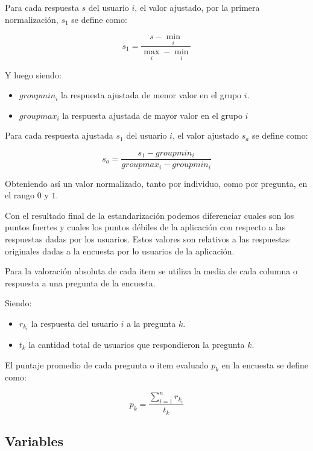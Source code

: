 Para cada respuesta $s$ del usuario $i$, el valor ajustado, por la primera 
normalización, $s_1$ se define como:

\begin{equation*}
s_1=\frac{s-\min_i}{\max_i-\min_i}
\end{equation*}

Y luego siendo:
\begin{itemize}
	\item $groupmin_i$ la respuesta ajustada de menor valor en el grupo $i$.
	\item $groupmax_i$ la respuesta ajustada de mayor valor en el grupo $i$
\end{itemize}

Para cada respuesta ajustada $s_1$ del usuario $i$, el valor ajustado $s_a$ se
define como:	

\begin{equation*}
s_a=\frac{s_1-groupmin_i}{groupmax_i-groupmin_i}
\end{equation*}

Obteniendo así un valor normalizado, tanto por individuo, como por pregunta, en
el rango $0$ y $1$.

Con el resultado final de la estandarización podemos diferenciar cuales son los
puntos fuertes y cuales los puntos débiles de la aplicación con respecto a las
respuestas dadas por los usuarios. Estos valores son relativos a las respuestas
originales dadas a la encuesta por lo usuarios de la aplicación.

Para la valoración absoluta de cada  item se utiliza la media de cada columna o
respuesta a una pregunta de la encuesta.

Siendo:
\begin{itemize} 
\item $r_{k_i}$ la respuesta del usuario $i$ a la pregunta $k$.
\item $t_k$ la cantidad total de usuarios que respondieron la pregunta $k$.
\end{itemize}

El puntaje promedio de cada pregunta o item evaluado  $p_k$ en la encuesta se
define como:

\begin{equation*}
p_k = \frac{\sum_{i=1}^n{r_{k_i}}}{t_k}
\end{equation*}

\subsection{Variables}
\label{sec:variables}

